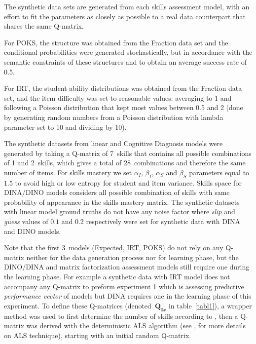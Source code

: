 The synthetic data sets are generated from each skills assessment model, with an effort to fit the parameters as closely as possible to a real data counterpart that shares the same Q-matrix.  

For POKS, the structure was obtained from the Fraction data set and the conditional probabilities were generated stochastically, but in accordance with the semantic constraints of these structures and to obtain an average success rate of 0.5.

For IRT, the student ability distributions was obtained from the Fraction data set, and the item difficulty was set to reasonable values: averaging to 1 and following a Poisson distribution that kept most values between 0.5 and 2 (done by generating random numbers from a Poisson distribution with lambda parameter set to 10 and dividing by 10). 

The synthetic datasets from linear and Cognitive Diagnosis models were generated by taking a Q-matrix of 7~skills that contains all possible combinations of 1 and 2~skills, which gives a total of 28~combinations and therefore the same number of items. For skills mastery we set $\alpha_I$, $\beta_I$, $\alpha_S$ and $\beta_S$ parameters equal to $1.5$ to avoid high or low entropy for student and item variance. Skills space for DINA/DINO models considers all possible combination of skills with same probability of appearance in the skills mastery matrix. 
The synthetic datasets with linear model ground truths do not have any noise factor where \textit{slip} and \textit{guess} values of $0.1$ and $0.2$ respectively were set for synthetic data with DINA and DINO models.

Note that the first 3~models (Expected, IRT, POKS) do not rely on any Q-matrix neither for the data generation process nor for learning phase, but the DINO/DINA and matrix factorization assessment models still require one during the learning phase. For example a synthetic data with IRT model does not accompany any Q-matrix to preform experiment 1 which is assessing predictive \textit{performance vector} of models but DINA requires one in the learning phase of this experiment. To define these Q-matrices (denoted~$\mathbf{Q}_{0x}$ in table~\ref{tabl1}), a wrapper method was used to first determine the number of skills according to \citet{Beheshti2012Numbers}, then a Q-matrix was derived with the deterministic ALS algorithm (see \citealp{Desmarais2013aied}, for more details on ALS technique), starting with an initial random Q-matrix.




